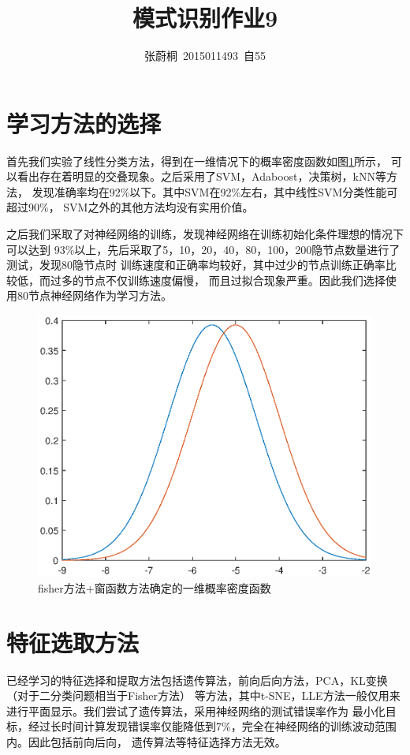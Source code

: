 \documentclass[UTF8,a4paper]{paper}
\title{模式识别作业9}
\author{张蔚桐\ 2015011493\ 自55}
\begin{document}
\maketitle
\section{学习方法的选择}
首先我们实验了线性分类方法，得到在一维情况下的概率密度函数如图\ref{1}所示，
可以看出存在着明显的交叠现象。之后采用了SVM，Adaboost，决策树，kNN等方法，
发现准确率均在92\%以下。其中SVM在92\%左右，其中线性SVM分类性能可超过90\%，
SVM之外的其他方法均没有实用价值。

之后我们采取了对神经网络的训练，发现神经网络在训练初始化条件理想的情况下可以达到
93\%以上，先后采取了5，10，20，40，80，100，200隐节点数量进行了测试，发现80隐节点时
训练速度和正确率均较好，其中过少的节点训练正确率比较低，而过多的节点不仅训练速度偏慢，
而且过拟合现象严重。因此我们选择使用80节点神经网络作为学习方法。

\begin{figure}[h]\centering\includegraphics[width=\textwidth]{fisher.eps}
\caption{fisher方法+窗函数方法确定的一维概率密度函数}\label{1}\end{figure}

\section{特征选取方法}
已经学习的特征选择和提取方法包括遗传算法，前向后向方法，PCA，KL变换（对于二分类问题相当于Fisher方法）
等方法，其中t-SNE，LLE方法一般仅用来进行平面显示。我们尝试了遗传算法，采用神经网络的测试错误率作为
最小化目标，经过长时间计算发现错误率仅能降低到7\%，完全在神经网络的训练波动范围内。因此包括前向后向，
遗传算法等特征选择方法无效。
\end{document}
